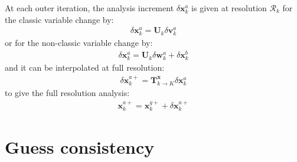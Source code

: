 \documentclass[12pt]{scrartcl}
\begin{document}
At each outer iteration, the analysis increment $\delta \mathbf{x}^a_k$ is given at resolution $\mathcal{R}_k$ for the classic variable change by:
\begin{align}
\label{eq:analysis_increment}
\delta \mathbf{x}^a_k = \mathbf{U}_k \delta \mathbf{v}^a_k
\end{align}
or for the non-classic variable change by:
\begin{align}
\label{eq:analysis_increment_w}
\delta \mathbf{x}^a_k = \mathbf{U}_k \delta \mathbf{w}^a_k + \delta \mathbf{x}^b_k
\end{align}
and it can be interpolated at full resolution:
\begin{align}
\label{eq:full_res_analysis_increment}
\delta \mathbf{x}^{a+}_k = \mathbf{T}^\mathbf{x}_{k \rightarrow K} \delta \mathbf{x}^a_k
\end{align}
to give the full resolution analysis:
\begin{align}
\label{eq:full_res_analysis}
\mathbf{x}^{a+}_k = \mathbf{x}^{g+}_k+\delta \mathbf{x}^{a+}_k
\end{align}

\section{Guess consistency}
\end{document}
